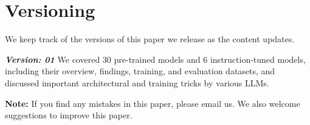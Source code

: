 \section{Versioning}
\label{sec:verion}
We keep track of the versions of this paper we release as the content updates. 

\noindent
\emph{\textbf{Version: 01}} We covered 30 pre-trained models and 6 instruction-tuned models, including their overview, findings, training, and evaluation datasets, and discussed important architectural and training tricks by various LLMs.

\noindent
\textbf{Note:} If you find any mistakes in this paper, please email us. We also welcome suggestions to improve this paper. 